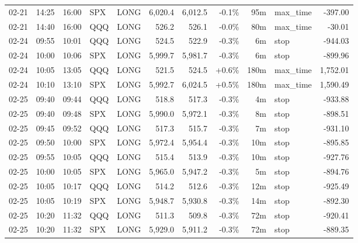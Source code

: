 \documentclass[11pt,a4paper,twoside]{article}
\begin{document}
\begin{center}
\begin{longtable}{>{\color{txtmain}}l l l l l r r r r >{\color{txtmain}}l r}
02-21 & 14:25 & 16:00 & SPX & LONG & 6,020.4 & 6,012.5 & \textcolor{lossred}{-0.1\%} & 95m & max\_time & \textcolor{lossred}{-397.00} \\
02-21 & 14:40 & 16:00 & QQQ & LONG & 526.2 & 526.1 & \textcolor{lossred}{-0.0\%} & 80m & max\_time & \textcolor{lossred}{-30.01} \\
02-24 & 09:55 & 10:01 & QQQ & LONG & 524.5 & 522.9 & \textcolor{lossred}{-0.3\%} & 6m & stop & \textcolor{lossred}{-944.03} \\
02-24 & 10:00 & 10:06 & SPX & LONG & 5,999.7 & 5,981.7 & \textcolor{lossred}{-0.3\%} & 6m & stop & \textcolor{lossred}{-899.96} \\
02-24 & 10:05 & 13:05 & QQQ & LONG & 521.5 & 524.5 & \textcolor{wingreen}{+0.6\%} & 180m & max\_time & \textcolor{wingreen}{1,752.01} \\
02-24 & 10:10 & 13:10 & SPX & LONG & 5,992.7 & 6,024.5 & \textcolor{wingreen}{+0.5\%} & 180m & max\_time & \textcolor{wingreen}{1,590.49} \\
02-25 & 09:40 & 09:44 & QQQ & LONG & 518.8 & 517.3 & \textcolor{lossred}{-0.3\%} & 4m & stop & \textcolor{lossred}{-933.88} \\
02-25 & 09:40 & 09:48 & SPX & LONG & 5,990.0 & 5,972.1 & \textcolor{lossred}{-0.3\%} & 8m & stop & \textcolor{lossred}{-898.51} \\
02-25 & 09:45 & 09:52 & QQQ & LONG & 517.3 & 515.7 & \textcolor{lossred}{-0.3\%} & 7m & stop & \textcolor{lossred}{-931.10} \\
02-25 & 09:50 & 10:00 & SPX & LONG & 5,972.4 & 5,954.4 & \textcolor{lossred}{-0.3\%} & 10m & stop & \textcolor{lossred}{-895.85} \\
02-25 & 09:55 & 10:05 & QQQ & LONG & 515.4 & 513.9 & \textcolor{lossred}{-0.3\%} & 10m & stop & \textcolor{lossred}{-927.76} \\
02-25 & 10:00 & 10:05 & SPX & LONG & 5,965.0 & 5,947.2 & \textcolor{lossred}{-0.3\%} & 5m & stop & \textcolor{lossred}{-894.76} \\
02-25 & 10:05 & 10:17 & QQQ & LONG & 514.2 & 512.6 & \textcolor{lossred}{-0.3\%} & 12m & stop & \textcolor{lossred}{-925.49} \\
02-25 & 10:05 & 10:19 & SPX & LONG & 5,948.7 & 5,930.8 & \textcolor{lossred}{-0.3\%} & 14m & stop & \textcolor{lossred}{-892.30} \\
02-25 & 10:20 & 11:32 & QQQ & LONG & 511.3 & 509.8 & \textcolor{lossred}{-0.3\%} & 72m & stop & \textcolor{lossred}{-920.41} \\
02-25 & 10:20 & 11:32 & SPX & LONG & 5,929.0 & 5,911.2 & \textcolor{lossred}{-0.3\%} & 72m & stop & \textcolor{lossred}{-889.35} \\

\end{longtable}
\end{center}
\end{document}
